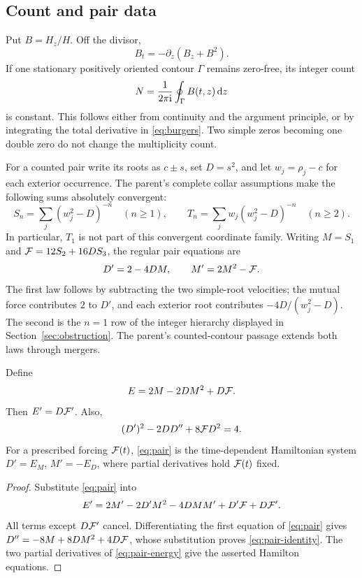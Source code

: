 \subsection{Count and pair data}
Put $B=H_z/H$. Off the divisor,
\begin{equation}
 B_t=-\partial_z(B_z+B^2).
 \label{eq:burgers}
\end{equation}
If one stationary positively oriented contour $\Gamma$ remains zero-free,
its integer count
\begin{equation}
 N=\frac{1}{2\pi\mathrm i}\oint_\Gamma B(t,z)\,\mathrm d z
 \label{eq:count}
\end{equation}
is constant. This follows either from continuity and the argument
principle, or by integrating the total derivative in
\eqref{eq:burgers}. Two simple zeros becoming one double zero do not
change the multiplicity count.

For a counted pair write its roots as $c\pm s$, set $D=s^2$, and let
$w_j=\rho_j-c$ for each exterior occurrence. The parent's complete
collar assumptions make the following sums absolutely convergent:
\begin{equation}
 S_n=\sum_j(w_j^2-D)^{-n}\quad(n\ge1),\qquad
 T_n=\sum_jw_j(w_j^2-D)^{-n}\quad(n\ge2).
 \label{eq:moments}
\end{equation}
In particular, $T_1$ is not part of this convergent coordinate family.
Writing $M=S_1$ and $\mathcal F=12S_2+16DS_3$, the regular pair equations are
\begin{equation}
 D'=2-4DM,\qquad M'=2M^2-\mathcal F.
 \label{eq:pair}
\end{equation}
The first law follows by subtracting the two simple-root velocities;
the mutual force contributes $2$ to $D'$, and each exterior root
contributes $-4D/(w_j^2-D)$. The second is the $n=1$ row of the
integer hierarchy displayed in Section~\ref{sec:obstruction}. The
parent's counted-contour passage extends both laws through mergers.

\begin{proposition}
Define
\begin{equation}
 E=2M-2DM^2+D\mathcal F.
 \label{eq:pair-energy}
\end{equation}
Then $E'=D\mathcal F'$. Also,
\begin{equation}
 (D')^2-2DD''+8\mathcal F D^2=4.
 \label{eq:pair-identity}
\end{equation}
For a prescribed forcing $\mathcal F(t)$, \eqref{eq:pair} is the
time-dependent Hamiltonian system $D'=E_M$, $M'=-E_D$, where partial
derivatives hold $\mathcal F(t)$ fixed.
\end{proposition}
\begin{proof}
Substitute \eqref{eq:pair} into
\[
 E'=2M'-2D'M^2-4DMM'+D'\mathcal F+D\mathcal F'.
\]
All terms except $D\mathcal F'$ cancel. Differentiating the first equation of
\eqref{eq:pair} gives $D''=-8M+8DM^2+4D\mathcal F$, whose substitution
proves \eqref{eq:pair-identity}. The two partial derivatives of
\eqref{eq:pair-energy} give the asserted Hamilton equations.
\end{proof}

